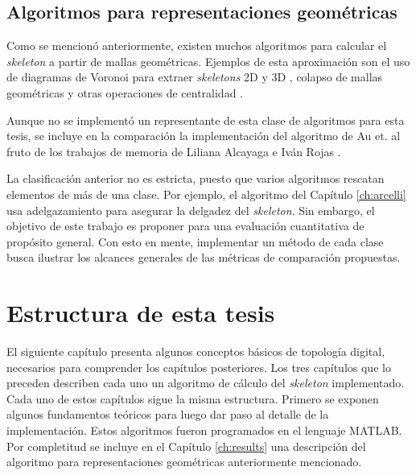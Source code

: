 \subsection{Algoritmos para representaciones geométricas}

Como se mencionó anteriormente, existen muchos algoritmos para calcular el \textit{skeleton} a partir de mallas geométricas. Ejemplos de esta aproximación son el uso de diagramas de Voronoi para extraer \textit{skeletons} 2D \cite{ogniewicz1992voronoi,ogniewicz1995hierarchic,liu2012generation} y 3D \cite{sherbrooke1996algorithm,dey2004approximating}, colapso de mallas geométricas \cite{au2008skeleton,janoos2009robust} y otras operaciones de centralidad \cite{bucksch2010skeltre,huang2013l1}.

Aunque no se implementó un representante de esta clase de algoritmos para esta tesis, se incluye en la comparación la implementación del algoritmo de Au et. al \cite{au2008skeleton} fruto de los trabajos de memoria de Liliana Alcayaga e Iván Rojas \cite{Alcayaga2012, rojas2014optimizacion}.

\vspace{5mm}

La clasificación anterior no es estricta, puesto que varios algoritmos rescatan elementos de más de una clase. Por ejemplo, el algoritmo del Capítulo \ref{ch:arcelli} usa adelgazamiento para asegurar la delgadez del \textit{skeleton}. Sin embargo, el objetivo de este trabajo es proponer para una evaluación cuantitativa de propósito general. Con esto en mente, implementar un método de cada clase busca ilustrar los alcances generales de las métricas de comparación propuestas.


\section{Estructura de esta tesis}

El siguiente capítulo presenta algunos conceptos básicos de topología digital, necesarios para comprender los capítulos posteriores. Los tres capítulos que lo preceden describen cada uno un algoritmo de cálculo del \textit{skeleton} implementado. Cada uno de estos capítulos sigue la misma estructura. Primero se exponen algunos fundamentos teóricos para luego dar paso al detalle de la implementación. Estos algoritmos fueron programados en el lenguaje MATLAB. Por completitud se incluye en el Capítulo \ref{ch:results} una descripción del algoritmo para representaciones geométricas anteriormente mencionado.
